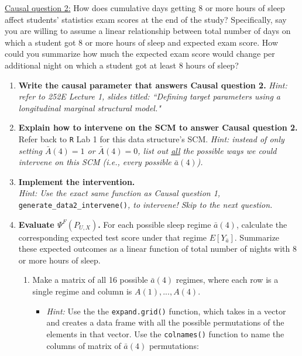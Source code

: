 \documentclass[answers]{exam}
\begin{document}
\vspace{4mm}
\noindent \underline{Causal question 2:} How does cumulative days getting 8 or more hours of sleep affect students' statistics exam scores at the end of the study? Specifically, say you are willing to assume a linear relationship between total number of days on which a student got 8 or more hours of sleep and expected exam score. How could you summarize how much the expected exam score would change per additional night on which a student got at least 8 hours of sleep?

\begin{enumerate}
\item \textbf{Write the causal parameter that answers Causal question 2.} \textit{Hint: refer to 252E Lecture 1, slides titled: ``Defining target parameters using a longitudinal marginal structural model."}
\item \textbf{Explain how to intervene on the SCM to answer Causal question 2.} Refer back to \texttt{R} Lab 1 for this data structure's SCM. \textit{Hint: instead of only setting $\bar{A}(4)=1$ or $\bar{A}(4)=0$, list out \underline{all} the possible ways we could intervene on this SCM (i.e., every possible $\bar{a}(4)$).}
\item \textbf{Implement the intervention.}\\
\emph{Hint: Use the exact same function as Causal question 1,} \texttt{generate\_data2\_intervene()}\emph{, to intervene! Skip to the next question.}
\item \textbf{Evaluate $\Psi^F(P_{U,X})$.} For each possible sleep regime $\bar{a}(4)$, calculate the corresponding expected test score under that regime $E[Y_{\bar{a}}]$. Summarize these expected outcomes as a linear function of total number of nights with 8 or more hours of sleep. %
\begin{enumerate}
\item Make a matrix of all 16 possible $\bar{a}(4)$ regimes, where each row is a single regime and column is $A(1), ..., A(4)$.
\begin{itemize}
\item[] \textit{Hint:} Use the the \texttt{expand.grid()} function, which takes in a vector and creates a data frame with all the possible permutations of the elements in that vector. Use the \texttt{colnames()} function to name the columns of matrix of $\bar{a}(4)$ permutations:

\end{itemize}
\end{enumerate}
\end{enumerate}
\end{document}
